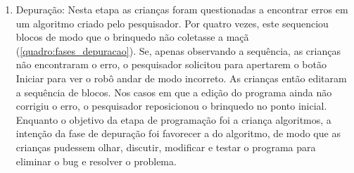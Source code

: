 \begin{enumerate}
    A complexidade da solução das fases é crescente. Enquanto a primeira fase exige apenas um comando, a segunda exige dois. A terceira fase também exige dois comandos, porém acrescenta o comando de giro. Além do número de comandos, a orientação da criança em relação ao RoPE é outro fator que dificulta a resolução. Nas fases 1 e 2 a criança programa o robô estando na mesma orientação que ele. Nas fases 3 a 5, porém, o robô está com seu lado direito voltado para a criança, e ela precisa pensar na perspectiva do brinquedo ou se posicionar para a mesma orientação que o mesmo\footnote{Piaget e Inhelder (1981) citam a dificuldade que crianças têm de imaginar-se em outra perspectiva (egocentrismo).}.
    
    Dúvidas e erros surgiram com frequência durante a programação, e o pesquisador auxiliou fazendo perguntas e dando exemplos quando necessário, e explicando as regras e direções.
    
    \item Depuração: Nesta etapa as crianças foram questionadas a encontrar erros em um algoritmo criado pelo pesquisador. Por quatro vezes, este sequenciou blocos de modo que o brinquedo não coletasse a maçã (\autoref{quadro:fases_depuracao}). Se, apenas observando a sequência, as crianças não encontraram o erro, o pesquisador solicitou para apertarem o botão Iniciar para ver o robô andar de modo incorreto. As crianças então editaram a sequência de blocos. Nos casos em que a edição do programa ainda não corrigiu o erro, o pesquisador reposicionou o brinquedo no ponto inicial. Enquanto o objetivo da etapa de programação foi a criança  algoritmos, a intenção da fase de depuração foi favorecer a  do algoritmo, de modo que as crianças pudessem olhar, discutir, modificar e testar o programa para eliminar o bug e resolver o problema.

\end{enumerate}

